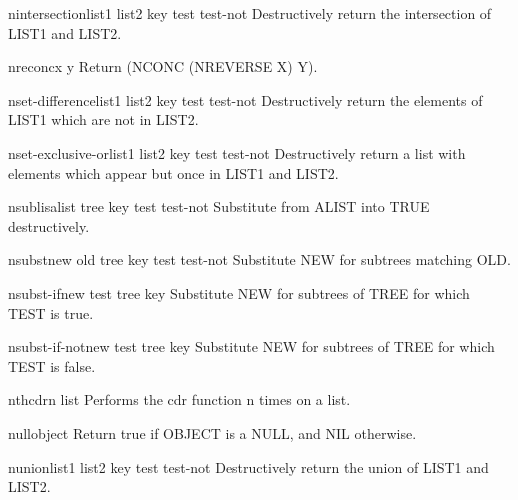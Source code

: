 \begin{function}{nintersection}{list1 list2 \key key test test-not}{}{}
  Destructively return the intersection of LIST1 and LIST2.
\end{function}

\begin{function}{nreconc}{x y}{}{}
  Return (NCONC (NREVERSE X) Y).
\end{function}

\begin{function}{nset-difference}{list1 list2 \key key test test-not}{}{}
  Destructively return the elements of LIST1 which are not in LIST2.
\end{function}

\begin{function}{nset-exclusive-or}{list1 list2 \key key test test-not}{}{}
  Destructively return a list with elements which appear but once in LIST1
   and LIST2.
\end{function}

\begin{function}{nsublis}{alist tree \key key test test-not}{}{}
  Substitute from ALIST into TRUE destructively.
\end{function}

\begin{function}{nsubst}{new old tree \key key test test-not}{}{}
  Substitute NEW for subtrees matching OLD.
\end{function}

\begin{function}{nsubst-if}{new test tree \key key}{}{}
  Substitute NEW for subtrees of TREE for which TEST is true.
\end{function}

\begin{function}{nsubst-if-not}{new test tree \key key}{}{}
  Substitute NEW for subtrees of TREE for which TEST is false.
\end{function}

\begin{function}{nthcdr}{n list}{}{}
  Performs the cdr function n times on a list.
\end{function}

\begin{function}{null}{object}{}{}
  Return true if OBJECT is a NULL, and NIL otherwise.
\end{function}

\begin{function}{nunion}{list1 list2 \key key test test-not}{}{}
  Destructively return the union of LIST1 and LIST2.
\end{function}

